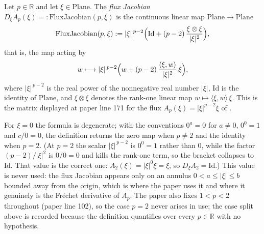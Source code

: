 \begin{definition}
Let $p\in\mathbb{R}$ and let $\xi\in\mathrm{Plane}$.  The \emph{flux Jacobian}
$D_{\xi}A_p(\xi)=:\mathrm{FluxJacobian}(p,\xi)$ is the continuous linear map
$\mathrm{Plane}\to\mathrm{Plane}$
\[
  \mathrm{FluxJacobian}(p,\xi)
  :=\lvert\xi\rvert^{\,p-2}\Bigl(\mathrm{Id}
      +(p-2)\,\frac{\xi\otimes\xi}{\lvert\xi\rvert^{2}}\Bigr),
\]
that is, the map acting by
\[
  w\longmapsto\lvert\xi\rvert^{\,p-2}
    \Bigl(w+(p-2)\,\frac{\langle\xi,w\rangle}{\lvert\xi\rvert^{2}}\,\xi\Bigr),
\]
where $\lvert\xi\rvert^{\,p-2}$ is the real power of the nonnegative real number
$\lvert\xi\rvert$, $\mathrm{Id}$ is the identity of $\mathrm{Plane}$, and
$\xi\otimes\xi$ denotes the rank-one linear map $w\mapsto\langle\xi,w\rangle\,\xi$.  This is
the matrix displayed at paper line 171 for the flux $A_p(\xi)=\lvert\xi\rvert^{p-2}\xi$ of
.

For $\xi=0$ the formula is degenerate; with the conventions $0^{a}=0$ for $a\ne0$, $0^{0}=1$ and
$c/0=0$, the definition returns the zero map when $p\ne2$ and the identity when $p=2$.  (At
$p=2$ the scalar $\lvert\xi\rvert^{\,p-2}$ is $0^{0}=1$ rather than $0$, while the factor
$(p-2)/\lvert\xi\rvert^{2}$ is $0/0=0$ and kills the rank-one term, so the bracket collapses to
$\mathrm{Id}$.  That value is the correct one: $A_2(\xi)=\lvert\xi\rvert^{0}\xi=\xi$, so
$D_{\xi}A_2=\mathrm{Id}$.)  This value is never used: the flux Jacobian
appears only on an annulus $0<a\le\lvert\xi\rvert\le b$ bounded away from the origin, which is
where the paper uses it and where it genuinely is the Fr\'echet derivative of $A_p$.  The paper
also fixes $1<p<2$ throughout (paper line 102), so the case $p=2$ never arises in use; the case
split above is recorded because the definition quantifies over every $p\in\mathbb{R}$ with no
hypothesis.
\end{definition}
